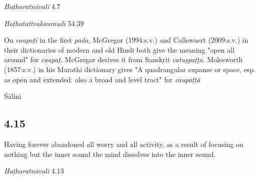 \begin{ekdosis}
\begin{testimonia}[hp04_014]
\emph{Haṭharatnāvalī} 4.7
\begin{versinnote}
\end{versinnote}

\emph{Haṭhatattvakaumudī}  54.39
\begin{versinnote}
\end{versinnote}

\end{testimonia}

\begin{philcomm}[hp04_014]
On \emph{caupaṭī} in the first \emph{pāda}, McGregor (1994:s.v.) and Callewaert (2009:s.v.) in their dictionaries of modern and old Hindi both give the meaning "open all around" for \emph{caupaṭ}. McGregor derives it from Sanskrit \emph{catuṣpaṭṭa}. Molesworth (1857:s.v.) in his Marathi dictionary gives "A quadrangular expanse or space, esp. as open and extended: also a broad and level tract" for \emph{caupaṭṭā}
\end{philcomm}

\begin{metre}[hp04_014]
Śālinī 
\end{metre}

\subsection*{4.15}
\begin{translation}[hp04_015]
Having forever abandoned all worry and all activity, as a result of focusing on nothing but the inner sound the mind dissolves into the inner sound.
\end{translation}


\begin{testimonia}[hp04_015]
\emph{Haṭharatnāvalī} 4.13
\begin{versinnote}
\end{versinnote}


\end{testimonia}
\end{ekdosis}
